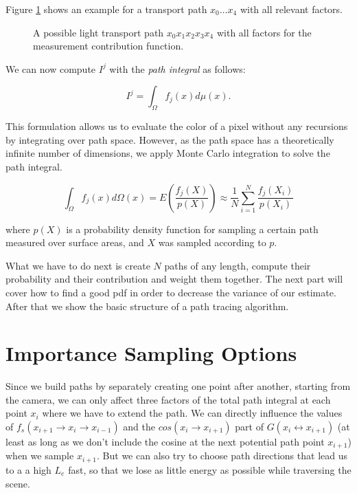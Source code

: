 Figure \ref{transportpath} shows an example for a transport path $x_0\dots x_4$ with all relevant factors.\\
\begin{figure}[ht]
	\centering
\def\svgwidth{400pt}
  
\caption{A possible light transport path $x_0x_1x_2x_3x_4$ with all factors for the measurement contribution function.}
\label{transportpath}\end{figure}
We can now compute $I^j$ with the \emph{path integral} as follows:

\begin{equation}
\label{path integral}
I^j=\int_\Omega f_j(x)d\mu(x).
\end{equation}

This formulation allows us to evaluate the color of a pixel without any recursions by integrating over path space. However, as the path space has a theoretically infinite number of dimensions, we apply Monte Carlo integration to solve the path integral.


\begin{equation}
\label{path integral estimator}
\int_{\Omega}f_j(x)d\Omega(x) = E\left(\frac{f_j(X)}{p(X)}\right) \approx \frac{1}{N}\sum_{i=1}^N \frac{f_j(X_i)}{p(X_i)}
\end{equation}

where $p(X)$ is a probability density function for sampling a certain path measured over surface areas, and $X$ was sampled according to $p$.

What we have to do next is create $N$ paths of any length, compute their probability and their contribution and weight them together. The next part will cover how to find a good pdf in order to decrease the variance of our estimate. After that we show the basic structure of a path tracing algorithm.








\section{Importance Sampling Options}
\label{importance_sampling_options}

Since we build paths by separately creating one point after another, starting from the camera, we can only affect three factors of the total path integral at each point $x_i$ where we have to extend the path. We can directly influence the values of $f_s(x_{i+1} \rightarrow x_i \rightarrow x_{i-1})$ and the $cos(x_i \rightarrow x_{i+1})$ part of $G(x_i \leftrightarrow x_{i+1})$ (at least as long as we don't include the cosine at the next potential path point $x_{i+1}$) when we sample $x_{i+1}$. But we can also try to choose path directions that lead us to a a high $L_e$ fast, so that we lose as little energy as possible while traversing the scene.

